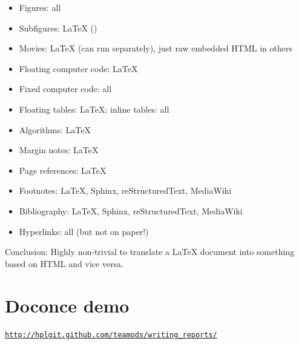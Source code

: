\documentclass[%
oneside,                 %
final,                   %
chapterprefix=true,      %
open=right               %
10pt]{book}
\begin{document}
\begin{itemize}
 \item Figures: all

 \item Subfigures: {\LaTeX} ()

 \item Movies: {\LaTeX} (can run separately), just raw embedded HTML in others

 \item Floating computer code: {\LaTeX}

 \item Fixed computer code: all

 \item Floating tables: {\LaTeX}; inline tables: all

 \item Algorithms: {\LaTeX}

 \item Margin notes: {\LaTeX}

 \item Page references: {\LaTeX}

 \item Footnotes: {\LaTeX}, Sphinx, reStructuredText, MediaWiki

 \item Bibliography: {\LaTeX}, Sphinx, reStructuredText, MediaWiki

 \item Hyperlinks: all (but not on paper!)
\end{itemize}

\noindent

Conclusion: Highly non-trivial to translate a {\LaTeX} document into something
based on HTML and vice versa.


\section{Doconce demo}

\href{{http://hplgit.github.com/teamods/writing_reports/}}{\nolinkurl{http://hplgit.github.com/teamods/writing_reports/}}
\end{document}
